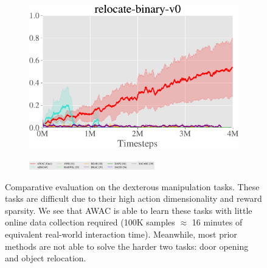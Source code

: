\begin{figure}[t]
    \begin{subfigure}[b]{0.3\textwidth}
        \center
        \includegraphics[width=1\textwidth]{awac/figures/hand/relocate-crop.pdf}
    \end{subfigure}
    
    \begin{subfigure}[b]{0.99\textwidth}
        \center
        \includegraphics[width=0.6\textwidth]{awac/figures/mujoco/legend_ncol2-crop.pdf}
    \end{subfigure}

    \caption{
    Comparative evaluation on the dexterous manipulation tasks. These tasks are difficult due to their high action dimensionality and reward sparsity. We see that AWAC is able to learn these tasks with little online data collection required (100K samples $\approx$ 16 minutes of equivalent real-world interaction time). Meanwhile, most prior methods are not able to solve the harder two tasks: door opening and object relocation. 
    \vspace{-0.5cm}
    }
    \label{fig:hand-learning-curves}
\end{figure}
